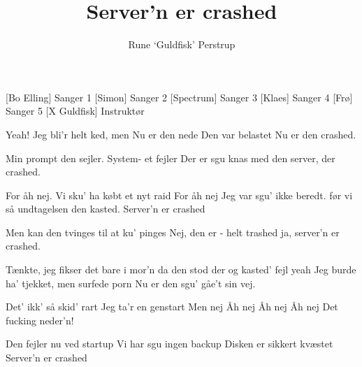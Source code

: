 \documentclass[a4paper,11pt]{article}
\title{Server'n er crashed}
\author{Rune `Guldfisk' Perstrup}
\begin{document}
 \maketitle

 \begin{roles}
   [Bo Elling] Sanger 1
   [Simon] Sanger 2
   [Spectrum] Sanger 3
   [Klaes] Sanger 4
   [Frø] Sanger 5
   [X Guldfisk] Instruktør
 \end{roles}


 \begin{song}
Yeah!
Jeg bli'r
helt ked, men
Nu er
den nede
Den var belastet
Nu er den crashed.

Min prompt
den sejler.
System-
et fejler
Der er sgu knas med
den server, der crashed.

For åh nej.
Vi sku' ha købt et nyt raid
For åh nej
Jeg var sgu' ikke beredt.
før vi så
undtagelsen den kasted.
Server'n er crashed

Men kan
den tvinges
til at
ku' pinges
Nej, den er - helt trashed
ja, server'n er crashed.


Tænkte, jeg fikser det bare i mor'n
da den stod der og kasted' fejl
yeah
Jeg burde ha' tjekket, men surfede porn
Nu er den sgu' gåe't sin vej.

Det' ikk'
så skid' rart
Jeg ta'r
en genstart
Men nej
Åh nej
Åh nej
Åh nej
Det fucking neder'n!

Den fejler nu ved startup
Vi har sgu ingen backup
Disken er sikkert kvæstet
Server'n er crashed


 


 \end{song}
\end{document}
